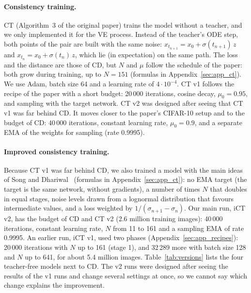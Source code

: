\documentclass{article}
\begin{document}
\paragraph{Consistency training.} CT (Algorithm~3 of the original paper) trains
the model without a teacher, and we only implemented it for the VE process.
Instead of the teacher's ODE step, both points of the pair are built with the
same noise: $x_{t_{n+1}} = x_0 + \sigma(t_{n+1})\, z$ and
$x_{t_n} = x_0 + \sigma(t_n)\, z$, which lie (in expectation) on the same path.
The loss and the distance are those of CD, but $N$ and $\mu$ follow the schedule
of the paper: both grow during training, up to $N = 151$ (formulas in
Appendix~\ref{sec:app_ct}). We use Adam, batch size 64 and a learning rate of
$4\cdot10^{-4}$. CT v1 follows the recipe of the paper with a short budget:
20\,000 iterations, cosine decay, $\mu_0 = 0.95$, and sampling with the target
network. CT v2 was designed after seeing that CT v1 was far behind CD. It moves
closer to the paper's CIFAR-10 setup and to the budget of CD: 40\,000 iterations,
constant learning rate, $\mu_0 = 0.9$, and a separate EMA of the weights for
sampling (rate 0.9995).

\paragraph{Improved consistency training.} Because CT v1 was far behind CD, we
also trained a model with the main ideas of Song and
Dhariwal~\cite{song2024improved} (formulas in Appendix~\ref{sec:app_ct}): no EMA
target (the target is the same network, without gradients), a number of times
$N$ that doubles in equal stages, noise levels drawn from a lognormal
distribution that favours intermediate values, and a loss weighted by
$1/(\sigma_{n+1} - \sigma_n)$. Our main run, iCT v2, has the budget of
CD and CT v2 (2.6 million training images): 40\,000 iterations, constant learning
rate, $N$ from 11 to 161 and a sampling EMA of rate 0.9995. An earlier run, iCT v1,
used two phases (Appendix~\ref{sec:app_recipes}): 20\,000 iterations with $N$ up
to 161 (stage 1), and 32\,289 more with batch size 128 and $N$ up to 641, for about
5.4 million images. Table~\ref{tab:versions} lists the four teacher-free models
next to CD. The v2 runs were designed after seeing the results of the v1 runs and
change several settings at once, so we cannot say which change explains the
improvement.
\end{document}
